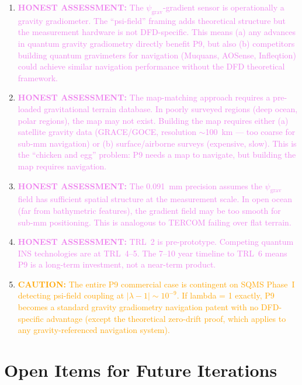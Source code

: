 \documentclass[11pt]{article}
\theoremstyle{definition}
\theoremstyle{remark}
\newcommand{\lambdaone}{|\lambda-1|}
\newcommand{\psigrav}{\psi_{\mathrm{grav}}}
\newcommand{\caution}[1]{\textcolor{orange}{\textbf{CAUTION:} #1}}
\newcommand{\honest}[1]{\textcolor{violet}{\textbf{HONEST ASSESSMENT:} #1}}
\begin{document}
\begin{enumerate}
\item \honest{The $\psigrav$-gradient sensor is operationally a gravity
  gradiometer. The ``psi-field'' framing adds theoretical structure but
  the measurement hardware is not DFD-specific. This means (a) any
  advances in quantum gravity gradiometry directly benefit P9, but also
  (b) competitors building quantum gravimeters for navigation (Muquans,
  AOSense, Infleqtion) could achieve similar navigation performance
  without the DFD theoretical framework.}

\item \honest{The map-matching approach requires a pre-loaded gravitational
  terrain database. In poorly surveyed regions (deep ocean, polar regions),
  the map may not exist. Building the map requires either (a) satellite
  gravity data (GRACE/GOCE, resolution $\sim$100~km --- too coarse for
  sub-mm navigation) or (b) surface/airborne surveys (expensive, slow).
  This is the ``chicken and egg'' problem: P9 needs a map to navigate,
  but building the map requires navigation.}

\item \honest{The 0.091~mm precision assumes the $\psigrav$ field has
  sufficient spatial structure at the measurement scale. In open ocean
  (far from bathymetric features), the gradient field may be too smooth
  for sub-mm positioning. This is analogous to TERCOM failing over flat
  terrain.}

\item \honest{TRL~2 is pre-prototype. Competing quantum INS technologies
  are at TRL~4--5. The 7--10 year timeline to TRL~6 means P9 is a
  long-term investment, not a near-term product.}

\item \caution{The entire P9 commercial case is contingent on SQMS Phase~I
  detecting psi-field coupling at $\lambdaone \sim 10^{-9}$. If lambda = 1
  exactly, P9 becomes a standard gravity gradiometry navigation patent with
  no DFD-specific advantage (except the theoretical zero-drift proof, which
  applies to any gravity-referenced navigation system).}
\end{enumerate}

\section{Open Items for Future Iterations}
\label{sec:open}
\end{document}
